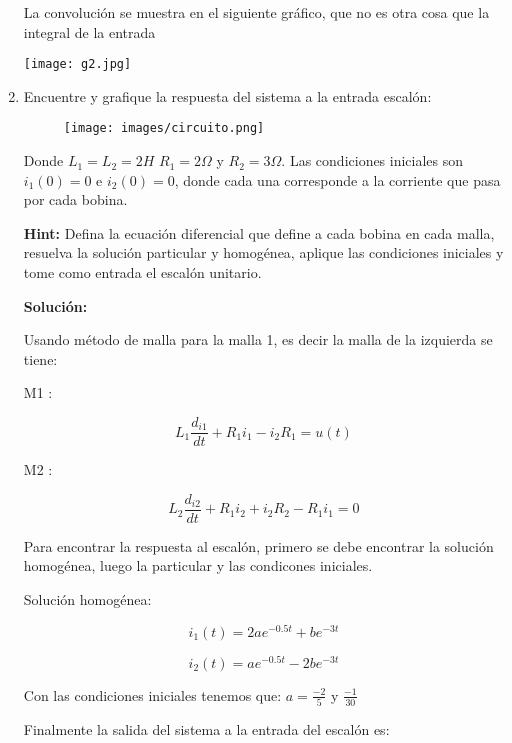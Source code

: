 \documentclass[letterpaper, 12pt]{article}
\newif\ifanswers
\begin{document}
\begin{enumerate}
{    La convolución se muestra en el siguiente gráfico, que no es otra cosa que la integral de la entrada
    
    \begin{center}
    \texttt{[image: g2.jpg]}
    \end{center}
    }
    \fi




    \item Encuentre y grafique la respuesta del sistema a la entrada escalón:

    
    \begin{figure}[h]
        \centering
        \texttt{[image: images/circuito.png]}
        \label{fig:enter-label}
    \end{figure}
   

    Donde $L_1 = L_2 = 2 H$ $R_1 = 2 \Omega$ y $R_2 = 3 \Omega$. Las condiciones iniciales son $i_1(0) = 0$ e $i_2(0) = 0$, donde cada una corresponde a la corriente que pasa por cada bobina.

    \textbf{Hint:} Defina la ecuación diferencial que define a cada bobina en cada malla, resuelva la solución particular y homogénea, aplique las condiciones iniciales y tome como entrada el escalón unitario.

    \ifanswers
    {\color{red}
    \textbf{Solución:}

    Usando método de malla para la malla 1, es decir la malla de la izquierda se tiene: 

    M1 : 

    \[
    L_1 \frac{d_{i1}}{dt} + R_1 i_1 - i_2 R_1 = u(t)
    \]

    M2 : 

    \[
    L_2 \frac{d_{i2}}{dt} + R_1 i_2 + i_2 R_2 - R_1 i_1 = 0
    \]

    Para encontrar la respuesta al escalón, primero se debe encontrar la solución homogénea, luego la particular y las condicones iniciales. 

    Solución homogénea: 

    \[
    i_1 (t) = 2a e^{-0.5t} + b e^{-3t}
    \]

    \[
    i_2 (t) = a e^{-0.5t} - 2b e^{-3t}
    \]

    Con las condiciones iniciales tenemos que: $a = \frac{-2}{5}$ y $\frac{-1}{30}$

    Finalmente la salida del sistema a la entrada del escalón es: 

}
\end{enumerate}
\end{document}
